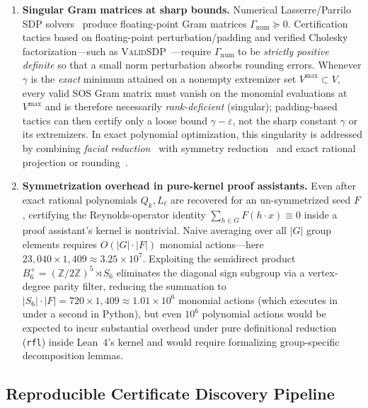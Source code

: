 \documentclass[11pt,a4paper]{article}
\theoremstyle{plain}
\theoremstyle{definition}
\theoremstyle{remark}
\newcommand{\Z}{\mathbb{Z}}
\newcommand{\Bplus}{B_6^+}
\newcommand{\code}[1]{\texttt{\small #1}}
\begin{document}
\begin{enumerate}[label=\textbf{Bottleneck \arabic*:}, leftmargin=*, itemsep=4pt]
  \item \textbf{Singular Gram matrices at sharp bounds.} Numerical Lasserre/Parrilo SDP solvers~\cite{Lasserre2001,Parrilo2003} produce floating-point Gram matrices $\Gamma_{\mathrm{num}} \succeq 0$. Certification tactics based on floating-point perturbation/padding and verified Cholesky factorization---such as \textsc{ValidSDP}~\cite{MartinDorelRoux2017,Roux2018}---require $\Gamma_{\mathrm{num}}$ to be \emph{strictly positive definite} so that a small norm perturbation absorbs rounding errors. Whenever $\gamma$ is the \emph{exact} minimum attained on a nonempty extremizer set $V^{\max} \subset V$, every valid SOS Gram matrix must vanish on the monomial evaluations at $V^{\max}$ and is therefore necessarily \emph{rank-deficient} (singular); padding-based tactics can then certify only a loose bound $\gamma - \varepsilon$, not the sharp constant $\gamma$ or its extremizers. In exact polynomial optimization, this singularity is addressed by combining \emph{facial reduction}~\cite{PermenterParrilo2018} with symmetry reduction~\cite{GatermannParrilo2004,Riener2013} and exact rational projection or rounding~\cite{PeyrlParrilo2008,Kaltofen2008,Kaltofen2012,MagronSafeyElDin2018}.
  \item \textbf{Symmetrization overhead in pure-kernel proof assistants.} Even after exact rational polynomials $Q_k, L_\ell$ are recovered for an un-symmetrized seed $F$, certifying the Reynolds-operator identity $\sum_{h\in G} F(h\cdot x) \equiv 0$ inside a proof assistant's kernel is nontrivial. Naive averaging over all $\lvert G\rvert$ group elements requires $O(\lvert G\rvert \cdot \lvert F\rvert)$ monomial actions---here $23{,}040 \times 1{,}409 \approx 3.25 \times 10^7$. Exploiting the semidirect product $\Bplus = (\Z/2\Z)^5 \rtimes S_6$ eliminates the diagonal sign subgroup via a vertex-degree parity filter, reducing the summation to $\lvert S_6\rvert \cdot \lvert F\rvert = 720 \times 1{,}409 \approx 1.01 \times 10^6$ monomial actions (which executes in under a second in Python), but even $10^6$ polynomial actions would be expected to incur substantial overhead under pure definitional reduction (\code{rfl}) inside Lean~4's kernel and would require formalizing group-specific decomposition lemmas.
\end{enumerate}

\subsection{Reproducible Certificate Discovery Pipeline}
\end{document}
